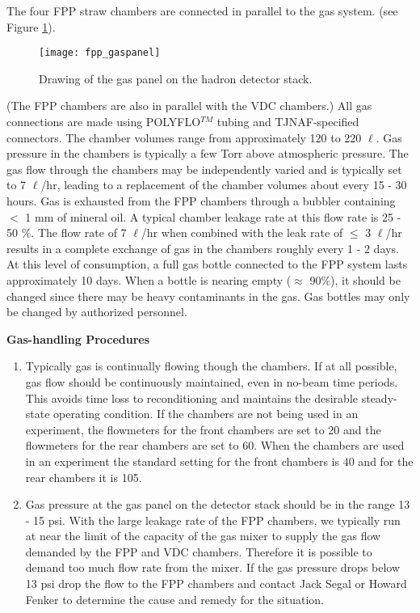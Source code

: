 {The four FPP straw chambers are connected in parallel to the gas system.
(see Figure \ref{fig:gaspanel}).

\begin{figure}
\begin{center}
\texttt{[image: fpp\_gaspanel]}
{\linespread{1.}
\caption[Detectors: Hadron Arm Gas Panel]{Drawing of the gas panel on the hadron detector stack.}
\label{fig:gaspanel}}
\end{center}
\end{figure}


(The FPP chambers are also in parallel with the VDC chambers.)
All gas connections
are made using POLYFLO$^{TM}$ tubing and TJNAF-specified connectors.
The chamber volumes range from approximately
120 to 220 $\ell$.
Gas pressure in the chambers is typically a few Torr above atmospheric
pressure.
The gas flow through the chambers may be independently varied and is
typically set to 7 $\ell$/hr, leading to a replacement of the chamber
volumes about every 15 - 30 hours.
Gas is exhausted from the FPP chambers through a bubbler containing $<$ 1 mm
of mineral oil. A typical chamber leakage rate at this flow rate is 25 - 50
$\%$.
The flow rate of 7 $\ell$/hr when combined with the leak rate of
$\le$ 3 $\ell$/hr results in a complete exchange of gas in the chambers
roughly every 1 - 2 days.
At this level of consumption, a full gas bottle connected to the FPP system
lasts approximately 10 days.
When a bottle is nearing empty ($\approx$ 90$\%$), it should be changed since
there may be heavy contaminants in the gas.
Gas bottles may only be changed by authorized personnel.

\begin{center}
{\bf Gas-handling Procedures}
\end{center}

\begin{enumerate}
\item Typically gas is continually flowing though the chambers.
If at all possible, gas flow should be continuously
maintained, even in no-beam time periods.   This avoids time loss to
reconditioning and maintains the desirable steady-state operating
condition. If the chambers are not being used in an experiment, 
the flowmeters for the front chambers
are set to 20 and the flowmeters for the rear chambers are set to 60.
When the chambers are used in an experiment the standard setting
for the front chambers is 40 and for the rear chambers it is 105. 
\item Gas pressure at the gas panel on the 
detector stack should be in the range
13 - 15 psi. With the large leakage rate of the
FPP chambers, we typically run at near the limit of the capacity of the
gas mixer to supply the gas flow demanded by the FPP and VDC chambers.
Therefore it is possible to demand too much flow rate from the mixer.
If the gas pressure drops below 13 psi drop the flow to the FPP chambers
and contact Jack Segal or Howard Fenker to determine the cause and
remedy for the situation.
\end{enumerate}

}
